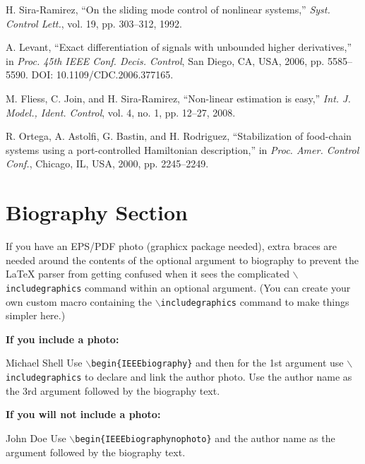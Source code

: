 \documentclass[lettersize,journal]{IEEEtran}
\begin{document}
\begin{thebibliography}{1}
  H. Sira-Ramirez, ``On the sliding mode control of nonlinear systems,'' \textit{Syst. Control Lett.}, vol. 19, pp. 303--312, 1992.

  A. Levant, ``Exact differentiation of signals with unbounded higher derivatives,''  in \textit{Proc. 45th IEEE Conf. Decis.
    Control}, San Diego, CA, USA, 2006, pp. 5585--5590. DOI: 10.1109/CDC.2006.377165.

  M. Fliess, C. Join, and H. Sira-Ramirez, ``Non-linear estimation is easy,'' \textit{Int. J. Model., Ident. Control}, vol. 4, no. 1, pp. 12--27, 2008.

  R. Ortega, A. Astolfi, G. Bastin, and H. Rodriguez, ``Stabilization of food-chain systems using a port-controlled Hamiltonian description,'' in \textit{Proc. Amer. Control Conf.}, Chicago, IL, USA,
  2000, pp. 2245--2249.

\end{thebibliography}

\newpage

\section{Biography Section}
If you have an EPS/PDF photo (graphicx package needed), extra braces are needed
around the contents of the optional argument to biography to prevent the LaTeX
parser from getting confused when it sees the complicated
$\backslash${\tt{includegraphics}} command within an optional argument. (You
can create your own custom macro containing the
$\backslash${\tt{includegraphics}} command to make things simpler here.)

\vspace{11pt}

\bf{If you include a photo:}\vspace{-33pt}
\begin{IEEEbiography}{Michael Shell}
  Use $\backslash${\tt{begin\{IEEEbiography\}}} and then for the 1st argument use $\backslash${\tt{includegraphics}} to declare and link the author photo.
  Use the author name as the 3rd argument followed by the biography text.
\end{IEEEbiography}

\vspace{11pt}

\bf{If you will not include a photo:}\vspace{-33pt}
\begin{IEEEbiographynophoto}{John Doe}
  Use $\backslash${\tt{begin\{IEEEbiographynophoto\}}} and the author name as the argument followed by the biography text.
\end{IEEEbiographynophoto}

\vfill
\end{document}
